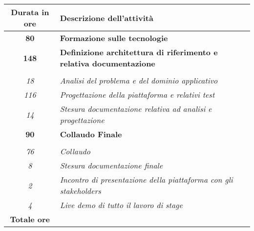 

\begin{tabularx}{\textwidth}{|c|X|}
	\hline
	\textbf{Durata in ore} & \textbf{Descrizione dell'attività} \\\hline
	
	\textbf{80} & \textbf{Formazione sulle tecnologie} \\	 
    \hline
    
    \textbf{148} & \textbf{Definizione architettura di riferimento e relativa documentazione} \\ \hdashline 
    \multirow{3}{0cm}\\ 
    \textit{18} & 
    \textit{Analisi del problema e del dominio applicativo} \\
    \textit{116} & 
    \textit{Progettazione della piattaforma e relativi test} \\
    \textit{14} & 
    \textit{Stesura documentazione relativa ad analisi e progettazione} \\
    \hline
    
    \textbf{90} & \textbf{Collaudo Finale}  \\ \hdashline 
    \multirow{4}{0cm}\\ 
    \textit{76} & 
    \textit{Collaudo} \\
    \textit{8} & 
    \textit{Stesura documentazione finale} \\
    \textit{2} & 
    \textit{Incontro di presentazione della piattaforma con gli stakeholders} \\
    \textit{4} & 
    \textit{Live demo di tutto il lavoro di stage} \\
    \hline
	
	\textbf{Totale ore} & \multicolumn{1}{|c|}{\textbf{\totaleOre}} \\\hline
	
	
\end{tabularx}